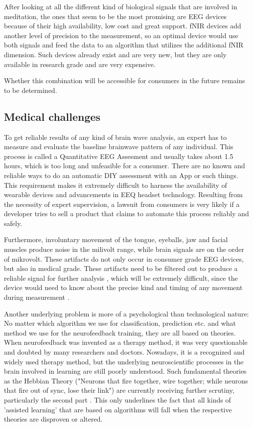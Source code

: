 \documentclass{llncs} %
\begin{document}
After looking at all the different kind of biological signals that are involved in meditation, the ones that seem to be the most promising are EEG devices because of their high availability, low cost and great support. fNIR devices add another level of precision to the measurement, so an optimal device would use both signals and feed the data to an algorithm that utilizes the additional fNIR dimension. Such devices already exist and are very new, but they are only available in research grade and are very expensive. \cite{ws} 
\medskip

Whether this combination will be accessible for consumers in the future remains to be determined. 
\subsection{Medical challenges}
To get reliable results of any kind of brain wave analysis, an expert has to measure and evaluate the baseline brainwave pattern of any individual. This process is called a Quantitative EEG Assesment and usually takes about 1.5 hours, which is too long and unfeasible for a consumer. There are no known and reliable ways to do an automatic DIY assessment with an App or such things. This requirement makes it extremely difficult to harness the availability of wearable devices and advancements in EEQ headset technology. 
Resulting from the necessity of expert supervision, a lawsuit from consumers is very likely if a developer tries to sell a product that claims to automate this process reliably and safely.
\medskip

Furthermore, involuntary movement of the tongue, eyeballs, jaw and facial muscles produce noise in the milivolt range, while brain signals are on  the order of mikrovolt. These artifacts do not only occur in consumer grade EEG devices, but also in medical grade.
These artifacts need to be filtered out to produce a reliable signal for further analysis \cite{Bashivan: et al}, which will be extremely difficult, since the device would need to know about the precise kind and timing of any movement during measurement \cite{Hammond}.
\medskip

Another underlying problem is more of a psychological than technological nature: No matter which algorithm we use for classification, prediction etc. and what method we use for the neurofeedback training, they are all based on theories. When neurofeedback was invented as a therapy method, it was very questionable and doubted by many researchers and doctors. Nowadays, it is a recognized and widely used therapy method, but the underlying neuroscientific processes in the brain involved in learning are still poorly understood. Such fundamental theories as the Hebbian Theory ("Neurons that fire together, wire together; while neurons that fire out of sync, lose their link") are currently receiving further scrutiny, particularly the second part \cite{Brown}. This only underlines the fact that all kinds of 'assisted learning' that are based on algorithms will fall when the respective theories are disproven or altered.
\medskip
\end{document}
